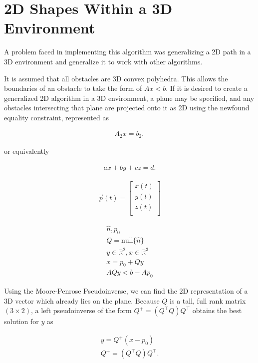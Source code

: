 \section{2D Shapes Within a 3D Environment}

A problem faced in implementing this algorithm was generalizing a 2D path in a 3D environment and generalize it to work with other algorithms. 

It is assumed that all obstacles are 3D convex polyhedra.
This allows the boundaries of an obstacle to take the form of $Ax < b$. 
If it is desired to create a generalized 2D algorithm in a 3D environment, a plane may be specified, and any obstacles intersecting that plane are projected onto it as 2D using the newfound equality constraint, represented as

\begin{align}
    A_2 x = b_2,
\end{align}

or equivalently

\begin{align}
    ax + by + cz = d.
\end{align}

\begin{align}
    \Vec{p}(t) =
    \begin{bmatrix}
        x(t)\\
        y(t)\\
        z(t)\\
    \end{bmatrix}
\end{align}

\begin{align*}
    \hat{n}, p_0\\
    Q = \text{null}\{\hat{n}\}\\
    y \in \mathbb{R}^2, x \in \mathbb{R}^3\\
    x = p_0 + Qy\\
    AQy < b - Ap_0
\end{align*}

Using the Moore-Penrose Pseudoinverse, we can find the 2D representation of a 3D vector which already lies on the plane. 
Because $Q$ is a tall, full rank matrix $(3 \times 2)$, a left pseudoinverse of the form $Q^+ = (Q^\top Q)Q^\top$ obtains the best solution for $y$ as

\begin{align*}
    y = Q^+ (x-p_0)\\
    Q^+ = (Q^\top Q)Q^\top.
\end{align*}

